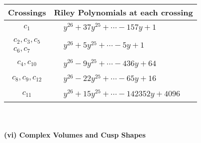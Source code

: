 \documentclass[1p]{elsarticle_modified}
\theoremstyle{definition}
\begin{document}
\begin{tabular}{m{50pt}|m{274pt}}
Crossings & \hspace{64pt}Riley Polynomials at each crossing \\
\hline $$\begin{aligned}c_{1}\end{aligned}$$&$\begin{aligned}
&y^{26}+37 y^{25}+\cdots-157 y+1
\end{aligned}$\\
\hline $$\begin{aligned}c_{2},c_{3},c_{5}\\c_{6},c_{7}\end{aligned}$$&$\begin{aligned}
&y^{26}+5 y^{25}+\cdots-5 y+1
\end{aligned}$\\
\hline $$\begin{aligned}c_{4},c_{10}\end{aligned}$$&$\begin{aligned}
&y^{26}-9 y^{25}+\cdots-436 y+64
\end{aligned}$\\
\hline $$\begin{aligned}c_{8},c_{9},c_{12}\end{aligned}$$&$\begin{aligned}
&y^{26}-22 y^{25}+\cdots-65 y+16
\end{aligned}$\\
\hline $$\begin{aligned}c_{11}\end{aligned}$$&$\begin{aligned}
&y^{26}+15 y^{25}+\cdots-142352 y+4096
\end{aligned}$\\
\hline
\end{tabular}\\~\\
\newpage\flushleft \textbf{(vi) Complex Volumes and Cusp Shapes}
\end{document}

